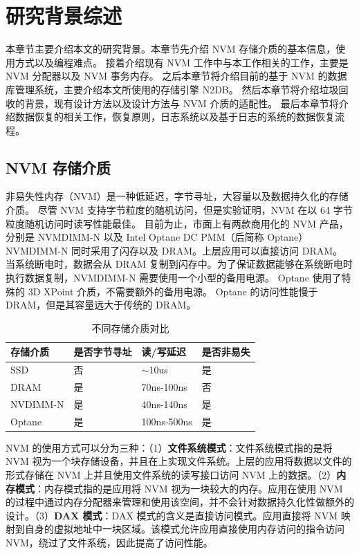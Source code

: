 
\chapter{研究背景综述}

本章节主要介绍本文的研究背景。本章节先介绍 NVM 存储介质的基本信息，使用方式以及编程难点。
接着介绍现有 NVM 工作中与本工作相关的工作，主要是 NVM 分配器以及 NVM 事务内存。
之后本章节将介绍目前的基于 NVM 的数据库管理系统，主要介绍本文所使用的存储引擎 N2DB。
然后本章节将介绍垃圾回收的背景，现有设计方法以及设计方法与 NVM 介质的适配性。
最后本章节将介绍数据恢复的相关工作，恢复原则，日志系统以及基于日志的系统的数据恢复流程。

\section{NVM 存储介质}

非易失性内存（NVM）是一种低延迟，字节寻址，大容量以及数据持久化的存储介质。
尽管 NVM 支持字节粒度的随机访问，但是实验证明，NVM 在以 64 字节粒度随机访问时读写性能最佳。
目前为止，市面上有两款商用化的 NVM 产品，分别是 NVMDIMM-N 以及 Intel Optane DC PMM（后简称 Optane）
NVMDIMM-N 同时采用了闪存以及 DRAM。上层应用可以直接访问 DRAM。
当系统断电时，数据会从 DRAM 复制到闪存中。为了保证数据能够在系统断电时执行数据复制，NVMDIMM-N 需要使用一个小型的备用电源。
Optane 使用了特殊的 3D XPoint 介质，不需要额外的备用电源。
Optane 的访问性能慢于 DRAM，但是其容量远大于传统的 DRAM。

\begin{table}
    \centering
    \caption{不同存储介质对比}
    \begin{tabular}{llll}
        \toprule
        存储介质 & 是否字节寻址 & 读/写延迟    & 是否非易失 \\
        \midrule
        SSD      & 否           & $ \sim $10us & 是         \\
        DRAM     & 是           & 70ns-100ns   & 否         \\
        NVDIMM-N & 是           & 40ns-140ns   & 是         \\
        Optane   & 是           & 100ns-500ns  & 是         \\
        \bottomrule
    \end{tabular}
    \label{tab:nvm}
\end{table}

NVM 的使用方式可以分为三种：（1）\textbf{文件系统模式}：文件系统模式指的是将 NVM 视为一个块存储设备，并且在上实现文件系统。上层的应用将数据以文件的形式存储在 NVM 上并且使用文件系统的读写接口访问 NVM 上的数据。（2）\textbf{内存模式}：内存模式指的是应用将 NVM 视为一块较大的内存。应用在使用 NVM 的过程中通过内存分配器来管理和使用该空间，并不会针对数据持久化性做额外的设计。（3）\textbf{DAX 模式}：DAX 模式的含义是直接访问模式。应用直接将 NVM 映射到自身的虚拟地址中一块区域。该模式允许应用直接使用内存访问的指令访问 NVM，绕过了文件系统，因此提高了访问性能。

